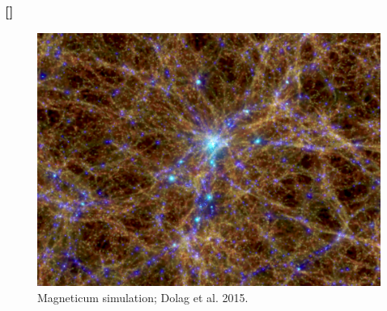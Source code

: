 \documentclass{beamer}
\makeatletter
\newcommand{\mylabel}{%
   [\beamer@againname]}
\makeatother
\begin{document}
\begin{frame}[plain,label=simulations]
    \frametitle{\mylabel}
    \begin{figure}
        \includegraphics[height=.8\textheight]{images/magneticum.png}
        \caption{Magneticum simulation; Dolag et al. 2015.}
    \end{figure}
\end{frame}
\end{document}

